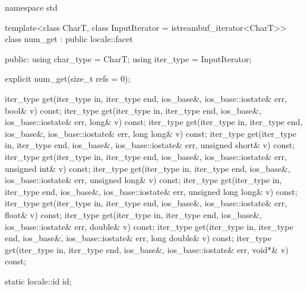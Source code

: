 %
\begin{codeblock}
namespace std {
  template<class CharT, class InputIterator = istreambuf_iterator<CharT>>
    class num_get : public locale::facet {
    public:
      using char_type = CharT;
      using iter_type = InputIterator;

      explicit num_get(size_t refs = 0);

      iter_type get(iter_type in, iter_type end, ios_base&,
                    ios_base::iostate& err, bool& v) const;
      iter_type get(iter_type in, iter_type end, ios_base&,
                    ios_base::iostate& err, long& v) const;
      iter_type get(iter_type in, iter_type end, ios_base&,
                    ios_base::iostate& err, long long& v) const;
      iter_type get(iter_type in, iter_type end, ios_base&,
                    ios_base::iostate& err, unsigned short& v) const;
      iter_type get(iter_type in, iter_type end, ios_base&,
                    ios_base::iostate& err, unsigned int& v) const;
      iter_type get(iter_type in, iter_type end, ios_base&,
                    ios_base::iostate& err, unsigned long& v) const;
      iter_type get(iter_type in, iter_type end, ios_base&,
                    ios_base::iostate& err, unsigned long long& v) const;
      iter_type get(iter_type in, iter_type end, ios_base&,
                    ios_base::iostate& err, float& v) const;
      iter_type get(iter_type in, iter_type end, ios_base&,
                    ios_base::iostate& err, double& v) const;
      iter_type get(iter_type in, iter_type end, ios_base&,
                    ios_base::iostate& err, long double& v) const;
      iter_type get(iter_type in, iter_type end, ios_base&,
                    ios_base::iostate& err, void*& v) const;

      static locale::id id;

}}
\end{codeblock}
